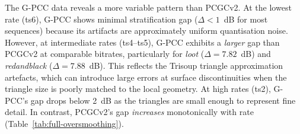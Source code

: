 The G-PCC data reveals a more variable pattern than PCGCv2.
At the lowest rate (ts6), G-PCC shows minimal stratification gap ($\Delta < 1$~dB
for most sequences) because its artifacts are approximately uniform quantisation
noise.
However, at intermediate rates (ts4--ts5), G-PCC exhibits a \emph{larger} gap
than PCGCv2 at comparable bitrates, particularly for \textit{loot}
($\Delta = 7.82$~dB) and \textit{redandblack} ($\Delta = 7.88$~dB).
This reflects the Trisoup triangle approximation artefacts, which can
introduce large errors at surface discontinuities when the triangle size is
poorly matched to the local geometry.
At high rates (ts2), G-PCC's gap drops below 2~dB as the triangles are small
enough to represent fine detail.
In contrast, PCGCv2's gap \emph{increases} monotonically with rate
(Table~\ref{tab:full-oversmoothing}).


